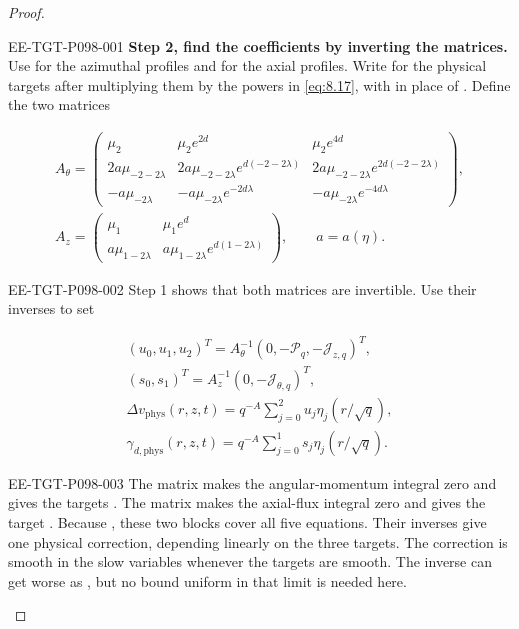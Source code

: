 \begin{proof}
%
\begin{EESegment}{EE-TGT-P098-001}
\textbf{Step 2, find the coefficients by inverting the matrices.} Use
 for the azimuthal profiles and
 for the axial profiles. Write
 for the physical
targets after multiplying them by the powers in \eqref{eq:8.17}, with
 in place of . Define the two matrices
\end{EESegment}
\[
\begin{gathered}
A_\theta=
\begin{pmatrix}
\mu_2 & \mu_2e^{2d} & \mu_2e^{4d}\\
2a\mu_{-2-2\lambda} & 2a\mu_{-2-2\lambda}e^{d(-2-2\lambda)}
  & 2a\mu_{-2-2\lambda}e^{2d(-2-2\lambda)}\\
-a\mu_{-2\lambda} & -a\mu_{-2\lambda}e^{-2d\lambda}
  & -a\mu_{-2\lambda}e^{-4d\lambda}
\end{pmatrix},
\\[4pt]
A_z=
\begin{pmatrix}
\mu_1 & \mu_1e^d\\
a\mu_{1-2\lambda} & a\mu_{1-2\lambda}e^{d(1-2\lambda)}
\end{pmatrix},
\qquad a=a(\eta).
\end{gathered}
\]
\begin{EESegment}{EE-TGT-P098-002}
Step 1 shows that both matrices are invertible. Use their inverses to set
\end{EESegment}
\[
\begin{gathered}
(u_0,u_1,u_2)^T=A_\theta^{-1}(0,-\mathcal P_q,-\mathcal J_{z,q})^T,\\
(s_0,s_1)^T=A_z^{-1}(0,-\mathcal J_{\theta,q})^T,\\
\Delta v_{\mathrm{phys}}(r,z,t)=q^{-A}\sum_{j=0}^{2}u_j\eta_j(r/\sqrt q),\\
\gamma_{d,\mathrm{phys}}(r,z,t)=q^{-A}\sum_{j=0}^{1}s_j\eta_j(r/\sqrt q).
\end{gathered}
\]
\begin{EESegment}{EE-TGT-P098-003}
The matrix  makes the angular-momentum integral zero and gives the
targets . The matrix
 makes the axial-flux integral zero and gives the target
. Because
, these two blocks cover all five equations. Their inverses give one
physical correction, depending linearly on the three targets. The correction is smooth in the slow
variables whenever the targets are smooth. The inverse can get worse as
, but no bound uniform in that limit is needed here.
\end{EESegment}


\end{proof}
